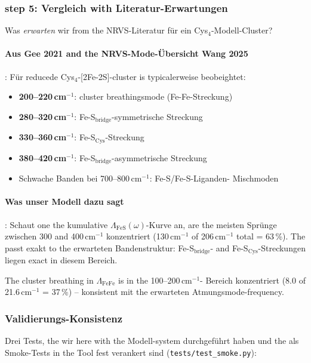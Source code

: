 \documentclass[11pt,a4paper,twoside]{article}
\theoremstyle{remark}
\begin{document}
\subsubsection*{step 5: Vergleich with Literatur-Erwartungen}

Was \emph{erwarten} wir from the NRVS-Literatur f\"ur ein
Cys$_4$-Modell-Cluster?

\paragraph{Aus Gee 2021 \cite{Gee2021} and the NRVS-Mode-\"Ubersicht
Wang 2025 \cite{Wang2025}}:
F\"ur reducede Cys$_4$-[2Fe-2S]-cluster is typicalerweise
beobeightet:
\begin{itemize}\setlength{\itemsep}{0pt}
  \item \textbf{200--220\,cm$^{-1}$}: cluster breathingsmode
        (Fe-Fe-Streckung)
  \item \textbf{280--320\,cm$^{-1}$}: Fe-S$_\text{bridge}$-symmetrische
        Streckung
  \item \textbf{330--360\,cm$^{-1}$}: Fe-S$_\text{Cys}$-Streckung
  \item \textbf{380--420\,cm$^{-1}$}: Fe-S$_\text{bridge}$-asymmetrische
        Streckung
  \item Schwache Banden bei 700--800\,cm$^{-1}$: Fe-S/Fe-S-Liganden-
        Mischmoden
\end{itemize}

\paragraph{Was unser Modell dazu sagt}: Schaut one the kumulative
$\Lambda_\text{FeS}(\omega)$-Kurve an, are the meisten Spr\"unge zwischen
300 and 400\,cm$^{-1}$ konzentriert (130\,cm$^{-1}$ of 206\,cm$^{-1}$
total = 63\,\%). The passt exakt to the erwarteten Bandenstruktur:
Fe-S$_\text{bridge}$- and Fe-S$_\text{Cys}$-Streckungen liegen exact
in diesem Bereich.

The cluster breathing in $\Lambda_\text{FeFe}$ is in the 100--200\,cm$^{-1}$-
Bereich konzentriert (8.0 of 21.6\,cm$^{-1}$ = 37\,\%) -- konsistent
mit the erwarteten Atmungsmode-frequency.

\subsubsection*{Validierungs-Konsistenz}

Drei Tests, the wir here with the Modell-system durchgef\"uhrt haben
und the als Smoke-Tests in the Tool fest verankert sind
(\texttt{tests/test\_smoke.py}):
\end{document}
